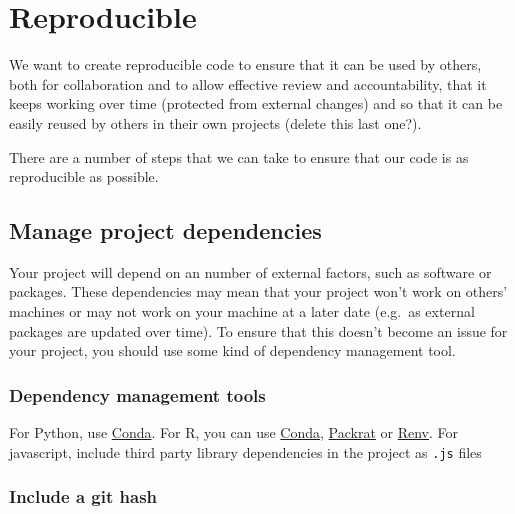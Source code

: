 \documentclass[]{book}
\begin{document}
\hypertarget{reproduce}{%
\section{Reproducible}\label{reproduce}}

We want to create reproducible code to ensure that it can be used by others, both for collaboration and to allow effective review and accountability, that it keeps working over time (protected from external changes) and so that it can be easily reused by others in their own projects (delete this last one?).

There are a number of steps that we can take to ensure that our code is as reproducible as possible.

\hypertarget{projdep}{%
\subsection{Manage project dependencies}\label{projdep}}

Your project will depend on an number of external factors, such as software or packages. These dependencies may mean that your project won't work on others' machines or may not work on your machine at a later date (e.g.~as external packages are updated over time). To ensure that this doesn't become an issue for your project, you should use some kind of dependency management tool.

\hypertarget{dependency-management-tools}{%
\subsubsection*{Dependency management tools}\label{dependency-management-tools}}

For Python, use \href{https://github.com/moj-analytical-services/coffee-and-coding-public/blob/master/2019-10-30\%20Conda/conda.pdf}{Conda}.
For R, you can use \href{https://github.com/moj-analytical-services/coffee-and-coding-public/blob/master/2019-10-30\%20Conda/conda.pdf}{Conda}, \href{https://rstudio.github.io/packrat/}{Packrat} or \href{https://blog.rstudio.com/2019/11/06/renv-project-environments-for-r/}{Renv}.
For javascript, include third party library dependencies in the project as \texttt{.js} files

\hypertarget{githash}{%
\subsubsection*{Include a git hash}\label{githash}}
\end{document}
